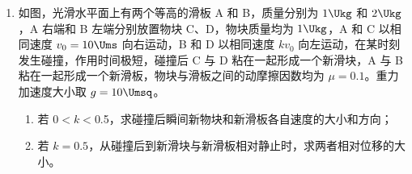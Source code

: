 \documentclass[\gkver]{gaokaozhenti}
\begin{document}
\begin{enumerate}
{$I_{\text{L1}}'=\frac{E}{R_{\text{L1}}+R_{1}}=\frac{220}{1000+10.42}\UA=0.218\UA$

则此时流过 L$_{1}$ 的电流大于 $30\UmA$，则 L$_{1}$ 发光，D 正确。

故选 CD。

（2）多用电表的操作步骤为：调整“指针定位螺丝”，使指针指到零刻度——机械调零；将选择开关旋转到“$\times$100”位置——选档；将两支表笔直接接触，调节“欧姆调零旋钮”，使指针指向欧姆零点——欧姆调零；测量指示灯 L$_{1}$ 两端的阻值——测量；将选择开关置于 OFF 位置或交流电压最高挡——关闭多用电表。故正确顺序为 CABDE。

由于使用时 L$_{1}$ 始终不亮，但加热和保温功能均正常，则说明 $R$、L$_{2}$、$R_{2}$、T 均正常，如图 3 可看出 L$_{1}$ 两端有 $1090\UO$ 左右的电阻，则说明 L$_{1}$ 始终不亮的原因是 L$_{1}$ 断路损坏。由于使用时 L$_{1}$ 始终不亮，但加热和保温功能均正常，则说明 $R$、L$_{2}$、$R_{2}$、T 均正常，如图 4 可看出欧姆表的示数几乎为零，但由于 $R_{L}=10.42\UO$ 此时选用的是“$\times$100”档则说明灯泡 L$_{1}$ 正常，则说明 L$_{1}$ 始终不亮的原因是 $R_{1}$ 断路损坏。
}

\item
如图，光滑水平面上有两个等高的滑板 A 和 B，质量分别为 $1\Ukg$ 和 $2\Ukg$，A 右端和 B 左端分别放置物块 C、D，物块质量均为 $1\Ukg$，A 和 C 以相同速度 $v_{0}=10\Ums$ 向右运动，B 和 D 以相同速度 $kv_{0}$ 向左运动，在某时刻发生碰撞，作用时间极短，碰撞后 C 与 D 粘在一起形成一个新滑块，A 与 B 粘在一起形成一个新滑板，物块与滑板之间的动摩擦因数均为 $\mu=0.1$。重力加速度大小取 $g=10\Umsq$。
\begin{enumerate}
	\item
	若 0$<k<$0.5，求碰撞后瞬间新物块和新滑板各自速度的大小和方向；
	\item
	若 $k=0.5$，从碰撞后到新滑块与新滑板相对静止时，求两者相对位移的大小。
\end{enumerate}


\end{enumerate}
\end{document}
